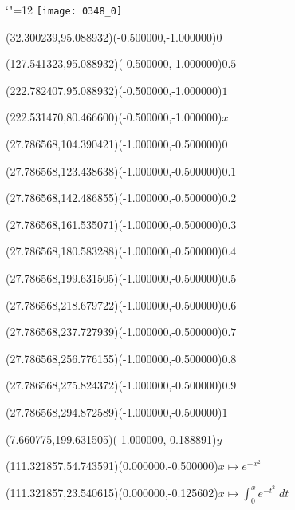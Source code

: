 \documentclass[12pt]{article}
\begin{document}
\makeatletter%
\let\ASYencoding\f@encoding%
\let\ASYfamily\f@family%
\let\ASYseries\f@series%
\let\ASYshape\f@shape%
\makeatother%
{\catcode`"=12%
\texttt{[image: 0348\_0]}%
}%
\kern -227.622047pt%
%
%
\fontsize{12.000000}{14.400000}\selectfont%
\usefont{\ASYencoding}{\ASYfamily}{\ASYseries}{\ASYshape}%
\ASYalign(32.300239,95.088932)(-0.500000,-1.000000){\vphantom{$10^4$}$0$}%
%
%
\fontsize{12.000000}{14.400000}\selectfont%
\ASYalign(127.541323,95.088932)(-0.500000,-1.000000){\vphantom{$10^4$}$0.5$}%
%
%
\fontsize{12.000000}{14.400000}\selectfont%
\ASYalign(222.782407,95.088932)(-0.500000,-1.000000){\vphantom{$10^4$}$1$}%
%
%
\fontsize{12.000000}{14.400000}\selectfont%
\ASYalign(222.531470,80.466600)(-0.500000,-1.000000){$x$}%
%
%
\fontsize{12.000000}{14.400000}\selectfont%
\ASYalign(27.786568,104.390421)(-1.000000,-0.500000){\vphantom{$10^4$}$0$}%
%
%
\fontsize{12.000000}{14.400000}\selectfont%
\ASYalign(27.786568,123.438638)(-1.000000,-0.500000){\vphantom{$10^4$}$0.1$}%
%
%
\fontsize{12.000000}{14.400000}\selectfont%
\ASYalign(27.786568,142.486855)(-1.000000,-0.500000){\vphantom{$10^4$}$0.2$}%
%
%
\fontsize{12.000000}{14.400000}\selectfont%
\ASYalign(27.786568,161.535071)(-1.000000,-0.500000){\vphantom{$10^4$}$0.3$}%
%
%
\fontsize{12.000000}{14.400000}\selectfont%
\ASYalign(27.786568,180.583288)(-1.000000,-0.500000){\vphantom{$10^4$}$0.4$}%
%
%
\fontsize{12.000000}{14.400000}\selectfont%
\ASYalign(27.786568,199.631505)(-1.000000,-0.500000){\vphantom{$10^4$}$0.5$}%
%
%
\fontsize{12.000000}{14.400000}\selectfont%
\ASYalign(27.786568,218.679722)(-1.000000,-0.500000){\vphantom{$10^4$}$0.6$}%
%
%
\fontsize{12.000000}{14.400000}\selectfont%
\ASYalign(27.786568,237.727939)(-1.000000,-0.500000){\vphantom{$10^4$}$0.7$}%
%
%
\fontsize{12.000000}{14.400000}\selectfont%
\ASYalign(27.786568,256.776155)(-1.000000,-0.500000){\vphantom{$10^4$}$0.8$}%
%
%
\fontsize{12.000000}{14.400000}\selectfont%
\ASYalign(27.786568,275.824372)(-1.000000,-0.500000){\vphantom{$10^4$}$0.9$}%
%
%
\fontsize{12.000000}{14.400000}\selectfont%
\ASYalign(27.786568,294.872589)(-1.000000,-0.500000){\vphantom{$10^4$}$1$}%
%
%
\fontsize{12.000000}{14.400000}\selectfont%
\ASYalign(7.660775,199.631505)(-1.000000,-0.188891){$y$}%
%
%
\fontsize{12.000000}{14.400000}\selectfont%
\ASYalign(111.321857,54.743591)(0.000000,-0.500000){$x\longmapsto{}e^{-x^2}$}%
%
%
\fontsize{12.000000}{14.400000}\selectfont%
\ASYalign(111.321857,23.540615)(0.000000,-0.125602){$\displaystyle x\longmapsto\int_{0}^{x}e^{-t^2}\;dt$}%
\end{document}
